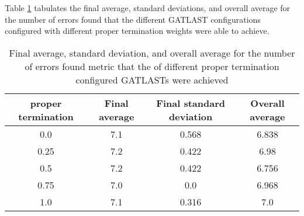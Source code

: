Table \ref{tab:HP:GA:Livelyness:number of errors found} tabulates the final average, standard deviations, and overall average for the number of errors found that the different GATLAST configurations configured with different proper termination weights were able to achieve.
\begin{table}[tbh!]
\centering
\begin{adjustbox}{trim=0cm 0cm 0cm 0cm, clip=true}
\begin{tabular}{|c|c|c|c|}
\hline
proper termination & Final average & Final standard deviation & Overall average\\
\hline
0.0 & 7.1 & 0.568 & 6.838\\\hline
0.25 & 7.2 & 0.422 & 6.98\\\hline
0.5 & 7.2 & 0.422 & 6.756\\\hline
0.75 & 7.0 & 0.0 & 6.968\\\hline
1.0 & 7.1 & 0.316 & 7.0\\\hline
\end{tabular}
\end{adjustbox}
\caption{Final average, standard deviation, and overall average for the number of errors found metric that the of different proper termination configured GATLASTs were achieved}
\label{tab:HP:GA:Livelyness:number of errors found}
\end{table}